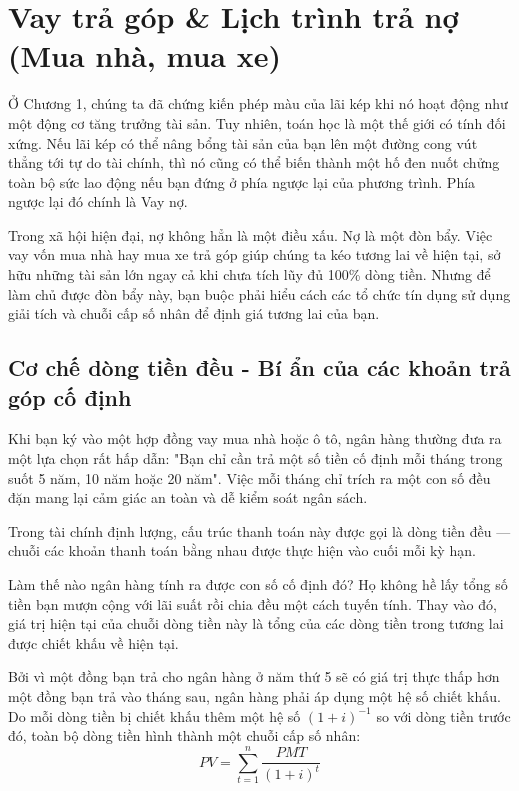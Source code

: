 \documentclass[14pt, a4paper, oneside]{extreport}
\begin{document}
\chapter{Vay trả góp \& Lịch trình trả nợ (Mua nhà, mua xe)}

Ở Chương 1, chúng ta đã chứng kiến phép màu của lãi kép khi nó hoạt động như một động cơ tăng trưởng tài sản. Tuy nhiên, toán học là một thế giới có tính đối xứng. Nếu lãi kép có thể nâng bổng tài sản của bạn lên một đường cong vút thẳng tới tự do tài chính, thì nó cũng có thể biến thành một hố đen nuốt chửng toàn bộ sức lao động nếu bạn đứng ở phía ngược lại của phương trình. Phía ngược lại đó chính là Vay nợ.

Trong xã hội hiện đại, nợ không hẳn là một điều xấu. Nợ là một đòn bẩy. Việc vay vốn mua nhà hay mua xe trả góp giúp chúng ta kéo tương lai về hiện tại, sở hữu những tài sản lớn ngay cả khi chưa tích lũy đủ 100\% dòng tiền. Nhưng để làm chủ được đòn bẩy này, bạn buộc phải hiểu cách các tổ chức tín dụng sử dụng giải tích và chuỗi cấp số nhân để định giá tương lai của bạn.

\section{Cơ chế dòng tiền đều - Bí ẩn của các khoản trả góp cố định}

Khi bạn ký vào một hợp đồng vay mua nhà hoặc ô tô, ngân hàng thường đưa ra một lựa chọn rất hấp dẫn: "Bạn chỉ cần trả một số tiền cố định mỗi tháng trong suốt 5 năm, 10 năm hoặc 20 năm". Việc mỗi tháng chỉ trích ra một con số đều đặn mang lại cảm giác an toàn và dễ kiểm soát ngân sách. 

Trong tài chính định lượng, cấu trúc thanh toán này được gọi là dòng tiền đều --- chuỗi các khoản thanh toán bằng nhau được thực hiện vào cuối mỗi kỳ hạn. 

Làm thế nào ngân hàng tính ra được con số cố định đó? Họ không hề lấy tổng số tiền bạn mượn cộng với lãi suất rồi chia đều một cách tuyến tính. Thay vào đó, giá trị hiện tại của chuỗi dòng tiền này là tổng của các dòng tiền trong tương lai được chiết khấu về hiện tại. 

Bởi vì một đồng bạn trả cho ngân hàng ở năm thứ 5 sẽ có giá trị thực thấp hơn một đồng bạn trả vào tháng sau, ngân hàng phải áp dụng một hệ số chiết khấu. Do mỗi dòng tiền bị chiết khấu thêm một hệ số $(1+i)^{-1}$ so với dòng tiền trước đó, toàn bộ dòng tiền hình thành một chuỗi cấp số nhân:
\begin{equation}
    PV = \sum_{t=1}^{n} \frac{PMT}{(1+i)^t}
\end{equation}
\end{document}
